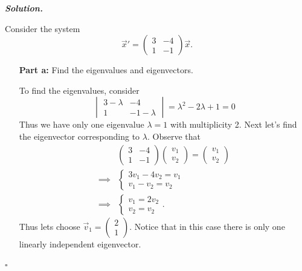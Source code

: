 \documentclass[12pt]{report}
\newenvironment{solution}[1][\it{Solution}]{\textbf{#1. } }{$\square$}
\begin{document}
\begin{solution}

    
    \noindent
    Consider the system
    \[ \vec{x}' = \begin{pmatrix}
        3 & -4\\
        1 & -1
    \end{pmatrix}\vec{x}.\]
    \begin{enumerate}
        \item [{\bf Part a:}] Find the eigenvalues and eigenvectors.
        
        \noindent
        To find the eigenvalues, consider
        \[
            \begin{vmatrix}
                3 - \lambda & -4\\
                1 & -1 - \lambda
            \end{vmatrix} = \lambda^2 - 2\lambda + 1 = 0
        \]
        Thus we have only one eigenvalue $\lambda = 1$ with multiplicity 2. Next let's find the eigenvector corresponding to $\lambda$. Observe that
        \begin{align*}
            &\begin{pmatrix}
                3 & -4\\
                1 & -1
            \end{pmatrix}\begin{pmatrix}
                v_1\\
                v_2
            \end{pmatrix} = \begin{pmatrix}
                v_1\\
                v_2
            \end{pmatrix}\\
            \implies & \begin{cases}
                3v_1 - 4v_2 = v_1\\
                v_1 - v_2 = v_2
            \end{cases}\\
            \implies &\begin{cases}
                v_1 = 2v_2\\
                v_2 = v_2
            \end{cases}.
        \end{align*}
        Thus lets choose $\vec{v}_1 = \begin{pmatrix}
            2\\
            1
        \end{pmatrix}$. Notice that in this case there is only one linearly independent eigenvector.
        

\end{enumerate}
\end{solution}
\end{document}
